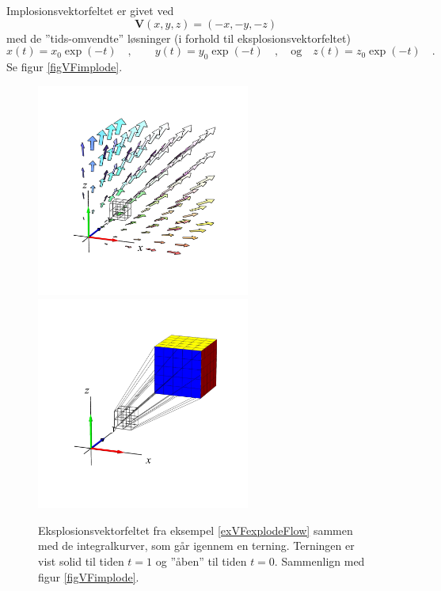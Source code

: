 \begin{example}
Implosionsvektorfeltet er givet ved
\begin{equation}
{\mathbf{V}}(x,y,z) = (-x, -y, -z)
\end{equation}
med de ''tids-omvendte'' løsninger (i forhold til eksplosionsvektorfeltet)
\begin{equation}
x(t) = x_{0}\exp(-t)\quad , \qquad
y(t) = y_{0}\exp(-t)\quad , \quad \textrm{og}
\quad z(t) = z_{0}\exp(-t) \quad .
\end{equation}
Se figur \ref{figVFimplode}.
\end{example}



\begin{figure}[h]
\centerline{\includegraphics[height=70mm]{FIGS/plotVFexplode1}\includegraphics[height=70mm]{FIGS/plotVFexplode2}}
\begin{center}
\caption{\small{Eksplosionsvektorfeltet fra
eksempel \ref{exVFexplodeFlow} sammen med de
integralkurver, som går igennem en terning. Terningen er vist solid til tiden $t=1$ og ''åben'' til tiden $t=0$. Sammenlign med figur \ref{figVFimplode}.}}
\label{figVFexplode}
\end{center}
\end{figure}


